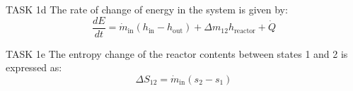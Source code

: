 TASK 1d  
The rate of change of energy in the system is given by:  
\[
\frac{dE}{dt} = \dot{m}_{\text{in}} \left( h_{\text{in}} - h_{\text{out}} \right) + \Delta m_{12} h_{\text{reactor}} + \dot{Q}
\]  

TASK 1e  
The entropy change of the reactor contents between states 1 and 2 is expressed as:  
\[
\Delta S_{12} = \dot{m}_{\text{in}} \left( s_2 - s_1 \right)
\]  